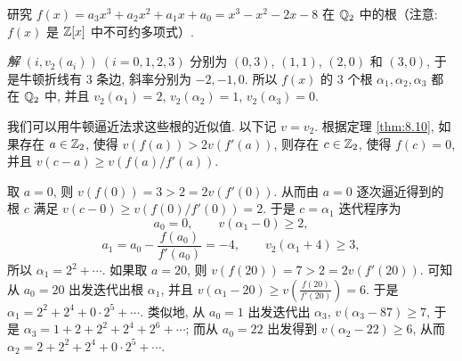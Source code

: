 \begin{example}
研究 $f(x)=a_3x^3+a_2x^2+a_1x+a_0=x^3-x^2-2x-8$ 在 $\mathbb{Q}_2$ 中的根（注意: $f(x)$ 是 $\mathbb{Z}[x]$ 中不可约多项式）.

\emph{解} $(i,v_2(a_i))\ (i=0,1,2,3)$ 分别为 $(0,3)$, $(1,1)$, $(2,0)$ 和 $(3,0)$, 于是牛顿折线有 $3$ 条边, 斜率分别为 $-2,-1,0$. 所以 $f(x)$ 的 $3$ 个根 $\alpha_1,\alpha_2,\alpha_3$ 都在 $\mathbb{Q}_2$ 中, 并且 $v_2(\alpha_1)=2$, $v_2(\alpha_2)=1$, $v_2(\alpha_3)=0$.

\begin{center}
\end{center}

我们可以用牛顿逼近法求这些根的近似值. 以下记 $v=v_2$. 根据定理 \ref{thm:8.10}, 如果存在 $a\in\mathbb{Z}_2$, 使得 $v(f(a))>2v(f'(a))$, 则存在 $c\in\mathbb{Z}_2$, 使得 $f(c)=0$, 并且 $v(c-a)\geqslant v(f(a)/f'(a))$.

取 $a=0$, 则 $v(f(0))=3>2=2v(f'(0))$. 从而由 $a=0$ 逐次逼近得到的根 $c$ 满足 $v(c-0)\geqslant v(f(0)/f'(0))=2$. 于是 $c=\alpha_1$ 迭代程序为
\[
  a_0=0,\qquad v(\alpha_1-0)\geqslant 2,
\]
\[
  a_1=a_0-\frac{f(a_0)}{f'(a_0)}=-4,\qquad v_2(\alpha_1+4)\geqslant 3,
\]
所以 $\alpha_1=2^2+\cdots$. 如果取 $a=20$, 则 $v(f(20))=7>2=2v(f'(20))$. 可知从 $a_0=20$ 出发迭代出根 $\alpha_1$, 并且 $v(\alpha_1-20)\geqslant v\left(\frac{f(20)}{f'(20)}\right)=6$. 于是 $\alpha_1=2^2+2^4+0\cdot 2^5+\cdots$. 类似地, 从 $a_0=1$ 出发迭代出 $\alpha_3$, $v(\alpha_3-87)\geqslant 7$, 于是 $\alpha_3=1+2+2^2+2^4+2^6+\cdots$; 而从 $a_0=22$ 出发得到 $v(\alpha_2-22)\geqslant 6$, 从而 $\alpha_2=2+2^2+2^4+0\cdot 2^5+\cdots$.
\end{example}

